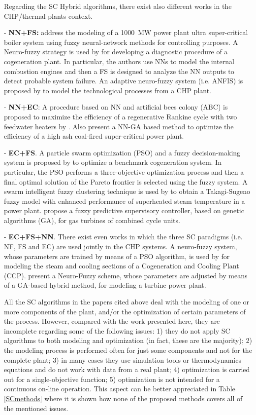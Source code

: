 Regarding the SC Hybrid algorithms, there exist also different works in the CHP/thermal plants context. 

- \textbf{NN+FS:} \cite{Liu2010} address the modeling of a \SI{1000}{MW} power plant ultra super-critical boiler system using fuzzy neural-network methods for controlling purposes. A Neuro-fuzzy strategy is used by \cite{Bare-2005} for developing a diagnostic procedure of a cogeneration plant. In particular, the authors use NNs to model the internal combustion engines and then a FS is designed to analyze the NN outputs to detect probable system failure. An adaptive neuro-fuzzy system (i.e. ANFIS) is proposed by \cite{Mastacan-2005} to model the technological processes from a CHP plant.

- \textbf{NN+EC}: A procedure based on NN and artificial bees colony (ABC) is proposed to maximize the efficiency of a regenerative Rankine cycle with two feedwater heaters by \cite{Rashidi-2011}. Also \cite{Suresh-2011} present a NN-GA based method to optimize the efficiency of a high ash coal-fired super-critical power plant.

- \textbf{EC+FS}. A particle swarm optimization (PSO) and a fuzzy decision-making system is proposed by \cite{Sayyaadi-2011} to optimize a benchmark cogeneration system. In particular, the PSO performs a three-objective optimization process and then a final optimal solution of the Pareto frontier is selected using the fuzzy system. A swarm intelligent fuzzy clustering technique is used by \cite{Su-12} to obtain a Takagi-Sugeno fuzzy model with enhanced performance of  superheated steam temperature in a power plant. \cite{Saez-2007} propose a fuzzy predictive supervisory controller, based on genetic algorithms (GA), for gas turbines of combined cycle units.

- \textbf{EC+FS+NN}.  There exist even works in which the three SC paradigms (i.e. NF, FS and EC) are used jointly in the CHP systems. A neuro-fuzzy system, whose parameters are trained by means of a PSO algorithm, is used by \cite{Tamiru-2009} for modeling  the steam and cooling sections of a Cogeneration and Cooling Plant (CCP). \cite{Kwun-2007} present a Neuro-Fuzzy scheme, whose parameters are adjusted by means of a GA-based hybrid method, for modeling a turbine power plant. 

All the SC algorithms in the papers cited above deal with the modeling of one or more components of the plant, and/or the optimization of certain parameters of the process. However, compared with the work presented here, they are incomplete regarding some of the following issues: 1) they do not apply SC algorithms to both modeling and optimization (in fact, these are the majority); 2) the modeling process is performed often for just some components and not for the complete plant; 3) in many cases they use simulation tools or thermodynamics equations and do not work with data from a real plant; 4) optimization is carried out for a single-objective function; 5) optimization is not intended for a continuous on-line operation. This aspect can be better appreciated in Table \ref{SCmethods} where it is shown how none of the proposed methods covers all of the mentioned issues.


